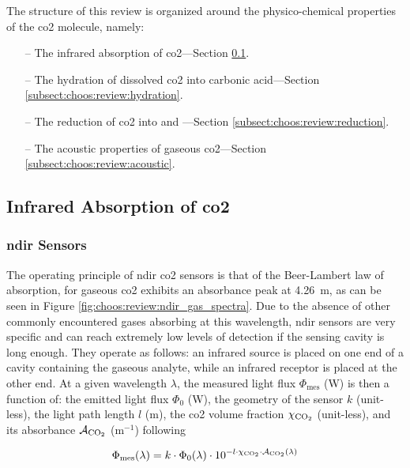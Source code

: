 The structure of this review is organized around the physico-chemical properties of the \gls{co2} molecule, namely:
\begin{enumerate}
	\item[--] The infrared absorption of \gls{co2}---Section \ref{subsect:choos:ir_abs}.
	\item[--] The hydration of dissolved \gls{co2} into carbonic acid---Section \ref{subsect:choos:review:hydration}.
	\item[--] The reduction of \gls{co2} into  and ---Section \ref{subsect:choos:review:reduction}.
	\item[--] The acoustic properties of gaseous \gls{co2}---Section \ref{subsect:choos:review:acoustic}.
\end{enumerate}

\subsection{Infrared Absorption of \texorpdfstring{\gls{co2}}{CO2}}\label{subsect:choos:ir_abs}

\subsubsection{\texorpdfstring{\gls{ndir}}{NDIR} Sensors}\label{subsect:choos:review:ndir}

The operating principle of \gls{ndir} \gls{co2} sensors is that of the Beer-Lambert law of absorption, for gaseous \gls{co2} exhibits an absorbance peak at 4.26~\textmu{}m, as can be seen in Figure \ref{fig:choos:review:ndir_gas_spectra}. Due to the absence of other commonly encountered gases absorbing at this wavelength, \gls{ndir} sensors are very specific and can reach extremely low levels of detection if the sensing cavity is long enough. They operate as follows: an infrared source is placed on one end of a cavity containing the gaseous analyte, while an infrared receptor is placed at the other end. At a given wavelength $\lambda$, the measured light flux $\Phi_\text{mes}$ (W) is then a function of: the emitted light flux $\Phi_0$ (W), the geometry of the sensor $k$ (unit-less), the light path length $l$ (m), the \gls{co2} volume fraction $\chi_{\ce{CO_2}}$ (unit-less), and its absorbance $\mathcal{A}_{\ce{CO_2}}$ (m$^{-1}$) following\cite{bernath1995}

\begin{equation}
	\Phi_\text{mes}(\lambda) = k \cdot \Phi_0(\lambda) \cdot 10^{- l \cdot \chi_{\ce{CO2}} \cdot \mathcal{A}_{\ce{CO_2}}(\lambda)}
\end{equation}

